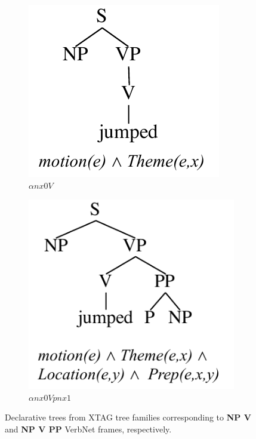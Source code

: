 \documentclass[11pt,a4paper]{article}
\begin{document}
\begin{figure}[h]
    \centering
    \begin{subfigure}{0.36\textwidth}
        \centering
        \includegraphics[width=1.0 \linewidth ]{resources/ch5_resources/jump_intransitive.pdf}
        \caption{$\alpha nx0V$}
        \label{fig:jump_intransitive}
    \end{subfigure}
    \begin{subfigure}{0.4\textwidth}
        \centering
        \includegraphics[width=1.0 \linewidth ]{resources/ch5_resources/jump_intransitive_pp.pdf}
        \caption{$\alpha nx0Vpnx1$}
        \label{fig:jump_intransitive_pp}
    \end{subfigure}
    \centering
    \caption{Declarative trees from XTAG tree families corresponding to \textbf{NP V} and \textbf{NP V PP} VerbNet frames, respectively.}
    \label{fig:vnet_xtag_mapping}
\end{figure}
\end{document}
